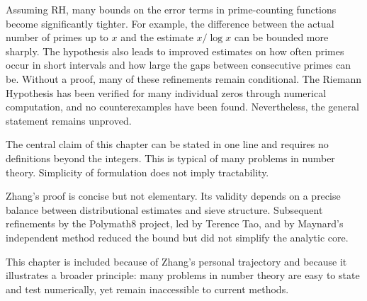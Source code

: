 Assuming RH, many bounds on the error terms in prime-counting functions become significantly tighter. For example, the difference between the actual number of primes up to $x$ and the estimate $x / \log x$ can be bounded more sharply. The hypothesis also leads to improved estimates on how often primes occur in short intervals and how large the gaps between consecutive primes can be. Without a proof, many of these refinements remain conditional. The Riemann Hypothesis has been verified for many individual zeros through numerical computation, and no counterexamples have been found. Nevertheless, the general statement remains unproved.


\begin{commentary}
The central claim of this chapter can be stated in one line and requires no definitions beyond the integers. This is typical of many problems in number theory. Simplicity of formulation does not imply tractability.

Zhang's proof is concise but not elementary. Its validity depends on a precise balance between distributional estimates and sieve structure. Subsequent refinements by the Polymath8 project, led by Terence Tao, and by Maynard's independent method reduced the bound but did not simplify the analytic core.

This chapter is included because of Zhang's personal trajectory and because it illustrates a broader principle: many problems in number theory are easy to state and test numerically, yet remain inaccessible to current methods.
\end{commentary}

\clearpage
{}

